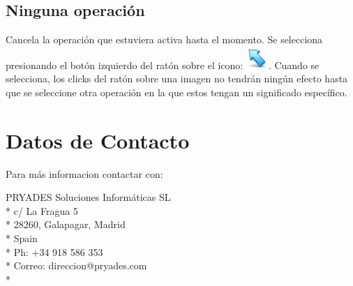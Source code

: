 \documentclass{plantilla-manual-usuario}
\begin{document}
\subsection{Ninguna operación}

Cancela la operación que estuviera activa hasta el momento. Se selecciona presionando el botón izquierdo del ratón sobre el icono: \includegraphics[scale=0.5]{images/cursor.png}. Cuando se selecciona, los clicks del ratón sobre una imagen no tendrán ningún efecto hasta que se seleccione otra operación en la que estos tengan un significado específico. 


\clearpage

\section{Datos de Contacto}

Para más informacion contactar con:

PRYADES Soluciones Informáticas SL\\*
c/ La Fragua 5\\*
28260, Galapagar, Madrid\\*
Spain\\*
Ph: +34 918 586 353\\*
Correo: direccion@pryades.com\\*
\end{document}
